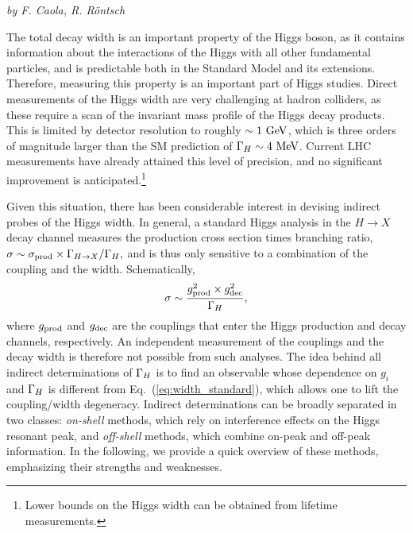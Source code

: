 \begin{center}{\it by F. Caola, 
R. R\"ontsch} \end{center}

The total decay width is an important property of the Higgs boson,
as it contains information about the interactions of the Higgs with all other
fundamental particles, and is predictable both in the Standard Model and its extensions.
Therefore, measuring this property is an important part of Higgs studies. 
%
Direct measurements of the Higgs width are very challenging at hadron colliders,
as these require a scan of the invariant mass profile of the Higgs decay
products.
This is limited by detector resolution to roughly $\sim 1~{\rm GeV}$,
which is  three orders of magnitude larger than the SM prediction of  ${\Gamma_H}\sim 4~{\rm MeV}$.
Current LHC measurements have already attained this level of precision, and no significant improvement
is anticipated.\footnote{Lower bounds
on the Higgs width can be obtained
from lifetime measurements.}

Given this situation, there has been considerable interest in devising indirect probes of the
Higgs width. In general, a standard Higgs analysis in the $H\to X$ decay channel 
measures the production cross section times branching ratio,
$\sigma \sim \sigma_{\rm prod}\times {\Gamma_{H\to X}}/{\Gamma_H},$
and is thus  only sensitive to a combination of the coupling and the width. Schematically,
\begin{equation}
\sigma \sim \frac{g_{\rm prod}^2 \times g_{\rm dec}^2}{{\Gamma_H}},
\label{eq:width_standard}
\end{equation}
where $g_{\rm prod}$ and $g_{\rm dec}$ are the couplings that enter the Higgs production
and decay channels, respectively. An independent measurement of the couplings and the decay width is 
therefore not possible from such analyses. The idea
behind all indirect determinations of ${\Gamma_H}$ is to find an observable whose dependence on
$g_i$ and ${\Gamma_H}$ is different from Eq.~(\ref{eq:width_standard}), which allows one
to lift the coupling/width degeneracy. Indirect determinations can be broadly separated in two
classes: \emph{on-shell} methods, which rely on interference effects on the Higgs resonant
peak, and \emph{off-shell} methods, which combine on-peak and off-peak information. In the
following, we provide a quick overview of these methods, emphasizing their strengths and weaknesses. 

